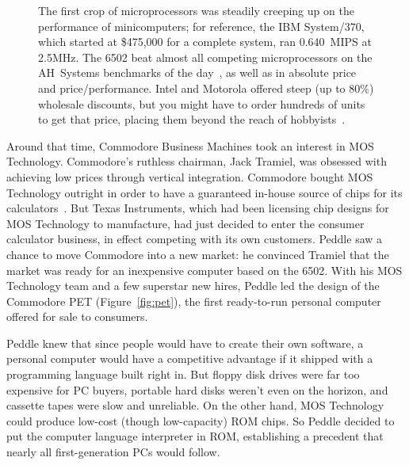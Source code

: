 \begin{figure}
  
  \caption{\label{fig:price_performance} 
    The first crop of microprocessors was steadily creeping up on the
    performance of minicomputers; for reference, the IBM System/370,
    which started at \$475,000 for a complete system, ran 0.640~MIPS at
    2.5MHz. 
    The 6502 beat almost all competing microprocessors on the AH~Systems benchmarks of
    the day~\cite{edn75:6502}, as well as in absolute price and price/performance.
    Intel and Motorola offered steep (up to 80\%) wholesale discounts,
    but you might have to order hundreds of units to
    get that price, placing them beyond the reach of hobbyists~\cite[p. 228]{ceruzzi}.}
\end{figure}



Around that time, Commodore Business Machines took an interest in MOS
Technology.  Commodore's ruthless chairman,
Jack Tramiel, was 
obsessed with achieving low prices through vertical integration.
Commodore bought
MOS Technology outright in order to have a guaranteed in-house source of
chips for its calculators~\cite{commodore}.
But Texas Instruments, which had been licensing chip designs for MOS
Technology to manufacture, had just decided
to enter the consumer calculator business, in effect competing with its own
customers. 
Peddle saw a chance to move Commodore into a new market: he convinced
Tramiel that the market was ready for an inexpensive computer
based on the 6502.
With his MOS Technology team and a few superstar
new hires, Peddle led the design of the Commodore PET (Figure~\ref{fig:pet}), 
the first ready-to-run personal computer offered for sale to consumers.

Peddle knew that since people would have to create their own software, a
personal computer would have a competitive advantage if it shipped with
a programming language built right in.
But floppy disk drives were far too expensive for PC buyers, portable
hard disks weren't even on the horizon, and cassette tapes were slow and
unreliable.  On the other hand, MOS Technology could produce low-cost
(though low-capacity) ROM 
chips.  So Peddle decided to  put the computer language interpreter in ROM, establishing
a precedent that nearly all first-generation PCs would follow.



